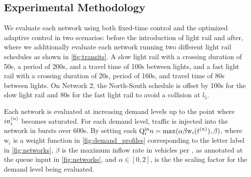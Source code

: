 %
% 
%

\subsection{Experimental Methodology}
We evaluate each network using both fixed-time control and the optimized adaptive
control in two scenarios: before the introduction of light rail and after, where we additionally evaluate each
network running two different light rail schedules as shown in
\cref{fig:transits}. A slow light rail with a crossing duration of 50s, a
period of 200s, and a travel time of 100s between lights, and a fast light rail with a crossing duration of 20s, period
of 160s, and travel time of 80s between lights. On Network 2, the North-South schedule is offset by 100s for the slow
light rail and 80s for the fast light rail to avoid a collision at $l_5$.


Each network is evaluated at increasing demand levels up to the point where $\inq{i}$
becomes saturated.
%
%
For each demand level, traffic is injected into the network in bursts over 600s.
By setting each 
$\QIN{i}{n} = \mathrm{max}(\alpha \beta \mathrm{w}_i(\tn[n]),\beta)$, where $\mathrm{w}_i$
is a weight function in \cref{fig:demand_profiles} corresponding to the letter label in 
\cref{fig:networks}, $\beta$ is the maximum inflow rate in vehicles per \DT, as annotated at the queue input in \cref{fig:networks}, and $\alpha \in [0,2]$, is the
the scaling factor for the demand level being evaluated.


